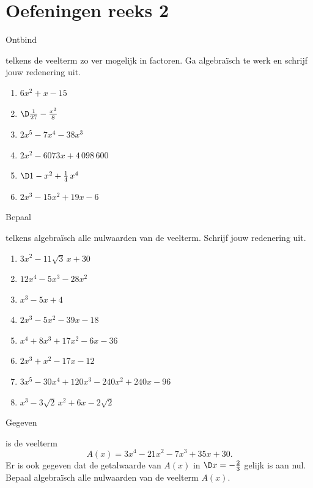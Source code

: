 \documentclass{ximera}
\begin{document}
\section*{Oefeningen reeks 2}

\begin{Oefening}\setcounter{enumi}{5} 
\hypertarget{oef4.5}{Ontbind} telkens de veelterm zo ver mogelijk in factoren. Ga algebra\"isch te werk en schrijf jouw redenering uit.  
\begin{multicols}{2}
\begin{enumerate}

\item
$6x^2+x-15$
\item
$\D \frac{1}{27} - \frac{x^3}{8}$
\item
$2x^5-7x^4-38x^3$
\item
$2x^2 - 6073x + 4\,098\,600$
\item
$\D 1-x^2+\frac{1}{4}\,x^4$
\item
$2x^3 - 15x^2 + 19x - 6$
\end{enumerate}
\end{multicols}
\end{Oefening}

\begin{Oefening}\setcounter{enumi}{6}  
\hypertarget{oef4.6}{Bepaal} telkens algebra\"isch alle nulwaarden van de veelterm. Schrijf jouw redenering uit.
\begin{multicols}{2}
\begin{enumerate}
\item
$3x^2-11\sqrt{3}\,x+30$
\item
$12x^4-5x^3-28x^2$
\item
$x^3-5x+4$
\item
$2x^3 - 5x^2 - 39x - 18$
\item
$x^4+8x^3+17x^2-6x-36$
\item
$2x^3+x^2-17x-12$ 
\item
$3x^5-30x^4+120x^3-240x^2+240x-96$
\item
$x^3 - 3\sqrt{2}\,x^2 + 6x - 2\sqrt{2}\,$
\end{enumerate}
\end{multicols}
\end{Oefening}

\begin{Oefening}\setcounter{enumi}{7}   
\hypertarget{oef4.7}{Gegeven} is de veelterm
\[
A(x) = 3x^4-21x^2-7x^3+35x+30.
\]
Er is ook gegeven dat de getalwaarde van $A(x)$ in $\D x = -\frac{2}{3}$ gelijk is aan nul. Bepaal algebra\"isch alle nulwaarden van de veelterm $A(x)$.
\end{Oefening}
\end{document}
